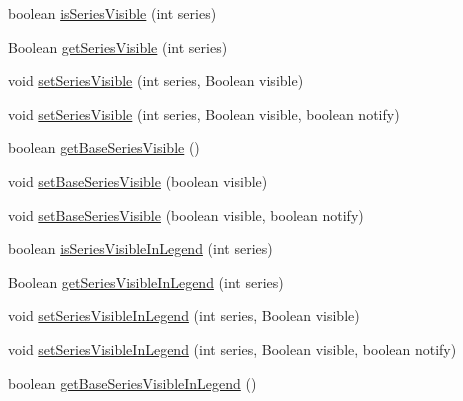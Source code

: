 \begin{DoxyCompactItemize}
boolean \mbox{\hyperlink{interfaceorg_1_1jfree_1_1chart_1_1renderer_1_1xy_1_1_x_y_item_renderer_a4d5994ae477d8942a490e9fc7fd84537}{is\+Series\+Visible}} (int series)
\item 
Boolean \mbox{\hyperlink{interfaceorg_1_1jfree_1_1chart_1_1renderer_1_1xy_1_1_x_y_item_renderer_acb62c922b439c9311e3e71d2d69b0823}{get\+Series\+Visible}} (int series)
\item 
void \mbox{\hyperlink{interfaceorg_1_1jfree_1_1chart_1_1renderer_1_1xy_1_1_x_y_item_renderer_a602bc5ae9818a0567f42436dc0560157}{set\+Series\+Visible}} (int series, Boolean visible)
\item 
void \mbox{\hyperlink{interfaceorg_1_1jfree_1_1chart_1_1renderer_1_1xy_1_1_x_y_item_renderer_aafe35da0d63cf0cb1b68bbf2b4142ce5}{set\+Series\+Visible}} (int series, Boolean visible, boolean notify)
\item 
boolean \mbox{\hyperlink{interfaceorg_1_1jfree_1_1chart_1_1renderer_1_1xy_1_1_x_y_item_renderer_a7703af7b787a8cc46ec822c840e2f79c}{get\+Base\+Series\+Visible}} ()
\item 
void \mbox{\hyperlink{interfaceorg_1_1jfree_1_1chart_1_1renderer_1_1xy_1_1_x_y_item_renderer_a223f697346a47561ead7d43ebdb9fb84}{set\+Base\+Series\+Visible}} (boolean visible)
\item 
void \mbox{\hyperlink{interfaceorg_1_1jfree_1_1chart_1_1renderer_1_1xy_1_1_x_y_item_renderer_aba42a9e2002f1602b4ae35029adc6181}{set\+Base\+Series\+Visible}} (boolean visible, boolean notify)
\item 
boolean \mbox{\hyperlink{interfaceorg_1_1jfree_1_1chart_1_1renderer_1_1xy_1_1_x_y_item_renderer_a20531f83ddd275c43cd996e59f0e3060}{is\+Series\+Visible\+In\+Legend}} (int series)
\item 
Boolean \mbox{\hyperlink{interfaceorg_1_1jfree_1_1chart_1_1renderer_1_1xy_1_1_x_y_item_renderer_a97403e6361d393a47b63139499d71b06}{get\+Series\+Visible\+In\+Legend}} (int series)
\item 
void \mbox{\hyperlink{interfaceorg_1_1jfree_1_1chart_1_1renderer_1_1xy_1_1_x_y_item_renderer_a2f4070365d96adda597ae686d9b195db}{set\+Series\+Visible\+In\+Legend}} (int series, Boolean visible)
\item 
void \mbox{\hyperlink{interfaceorg_1_1jfree_1_1chart_1_1renderer_1_1xy_1_1_x_y_item_renderer_a65cda07d5010b28e7778efe3c87690f8}{set\+Series\+Visible\+In\+Legend}} (int series, Boolean visible, boolean notify)
\item 
boolean \mbox{\hyperlink{interfaceorg_1_1jfree_1_1chart_1_1renderer_1_1xy_1_1_x_y_item_renderer_ac39942d497bba9355b4b1e597028ce1a}{get\+Base\+Series\+Visible\+In\+Legend}} ()

\end{DoxyCompactItemize}
